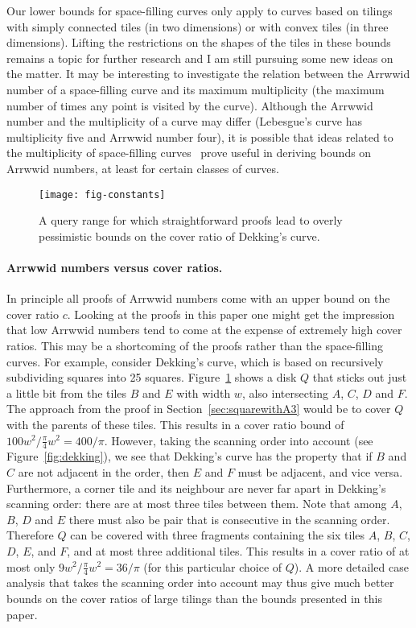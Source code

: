 \documentclass[11pt,a4paper]{article}
\begin{document}
Our lower bounds for space-filling curves only apply to curves based on tilings with simply connected tiles (in two dimensions) or with convex tiles (in three dimensions). Lifting the restrictions on the shapes of the tiles in these bounds remains a topic for further research and I am still pursuing some new ideas on the matter. It may be interesting to investigate the relation between the Arrwwid number of a space-filling curve and its maximum multiplicity (the maximum number of times any point is visited by the curve). Although the Arrwwid number and the multiplicity of a curve may differ (Lebesgue's curve has multiplicity five and Arrwwid number four), it is possible that ideas related to the multiplicity of space-filling curves~\cite{Mandelbrot1983} prove useful in deriving bounds on Arrwwid numbers, at least for certain classes of curves.

\begin{figure}
\centering
\texttt{[image: fig-constants]}
\caption{A query range for which straightforward proofs lead to overly pessimistic bounds on the cover ratio of Dekking's curve.}
\label{fig:constants}
\end{figure}

\paragraph{Arrwwid numbers versus cover ratios.}
In principle all proofs of Arrwwid numbers come with an upper bound on the cover ratio $c$. Looking at the proofs in this paper one might get the impression that low Arrwwid numbers tend to come at the expense of extremely high cover ratios. This may be a shortcoming of the proofs rather than the space-filling curves. For example, consider Dekking's curve, which is based on recursively subdividing squares into 25 squares. Figure~\ref{fig:constants} shows a disk $Q$ that sticks out just a little bit from the tiles $B$ and $E$ with width $w$, also intersecting $A$, $C$, $D$ and $F$. The approach from the proof in Section~\ref{sec:squarewithA3} would be to cover $Q$ with the parents of these tiles. This results in a cover ratio bound of $100w^2 / \frac\pi4 w^2 = 400/\pi$. However, taking the scanning order into account (see Figure~\ref{fig:dekking}), we see that Dekking's curve has the property that if $B$ and $C$ are not adjacent in the order, then $E$ and $F$ must be adjacent, and vice versa. Furthermore, a corner tile and its neighbour are never far apart in Dekking's scanning order: there are at most three tiles between them. Note that among $A$, $B$, $D$ and $E$ there must also be pair that is consecutive in the scanning order. Therefore $Q$ can be covered with three fragments containing the six tiles $A$, $B$, $C$, $D$, $E$, and $F$, and at most three additional tiles. This results in a cover ratio of at most only $9w^2 / \frac\pi4 w^2 = 36/\pi$ (for this particular choice of $Q$). A more detailed case analysis that takes the scanning order into account may thus give much better bounds on the cover ratios of large tilings than the bounds presented in this paper.
\end{document}
